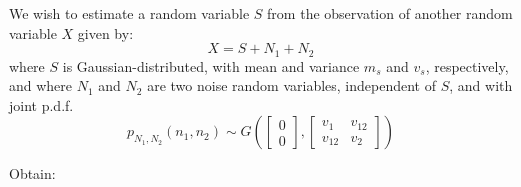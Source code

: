 \else

\question 
We wish to estimate a random variable $S$ from the observation of another random variable $X$ given by:
$$X=S+N_1+N_2$$
where $S$ is Gaussian-distributed, with mean and variance $m_s$ and $v_s$, respectively, and where $N_1$ and $N_2$ are two noise random variables, independent of $S$, and with joint p.d.f. 
$$
p_{N_1,N_2}\left(n_1,n_2\right) 
	\sim G\left ( \begin{bmatrix} 0 \\ 0 \end{bmatrix},
	              \begin{bmatrix} v_1 & v_{12} \\ v_{12} & v_2 \end{bmatrix}
	      \right)
$$

Obtain:

